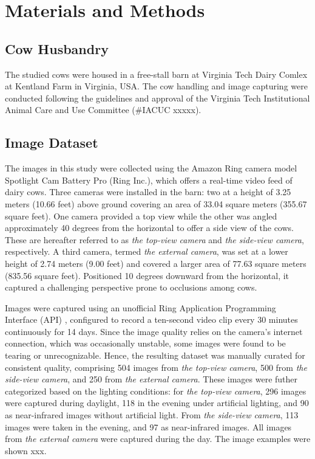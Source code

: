 \section{Materials and Methods}

\subsection*{Cow Husbandry}

The studied cows were housed in a free-stall barn at Virginia Tech Dairy Comlex at Kentland Farm in Virginia, USA. The cow handling and image capturing were conducted following the guidelines and approval of the Virginia Tech Institutional Animal Care and Use Committee (\#IACUC xxxxx).

\subsection*{Image Dataset}

The images in this study were collected using the Amazon Ring camera model Spotlight Cam Battery Pro (Ring Inc.), which offers a real-time video feed of dairy cows. Three cameras were installed in the barn: two at a height of 3.25 meters (10.66 feet) above ground covering an area of 33.04 square meters (355.67 square feet). One camera provided a top view while the other was angled approximately 40 degrees from the horizontal to offer a side view of the cows. These are hereafter referred to as \textit{the top-view camera} and \textit{the side-view camera}, respectively. A third camera, termed \textit{the external camera}, was set at a lower height of 2.74 meters (9.00 feet) and covered a larger area of 77.63 square meters (835.56 square feet). Positioned 10 degrees downward from the horizontal, it captured a challenging perspective prone to occlusions among cows.

Images were captured using an unofficial Ring Application Programming Interface (API) \citep{greif_dgreifring_2024}, configured to record a ten-second video clip every 30 minutes continuously for 14 days. Since the image quality relies on the camera's internet connection, which was occasionally unstable, some images were found to be tearing or unrecognizable. Hence, the resulting dataset was manually curated for consistent quality, comprising 504 images from \textit{the top-view camera}, 500 from \textit{the side-view camera}, and 250 from \textit{the external camera}. These images were futher categorized based on the lighting conditions: for \textit{the top-view camera}, 296 images were captured during daylight, 118 in the evening under artificial lighting, and 90 as near-infrared images without artificial light. From \textit{the side-view camera}, 113 images were taken in the evening, and 97 as near-infrared images. All images from \textit{the external camera} were captured during the day. The image examples were shown xxx.

